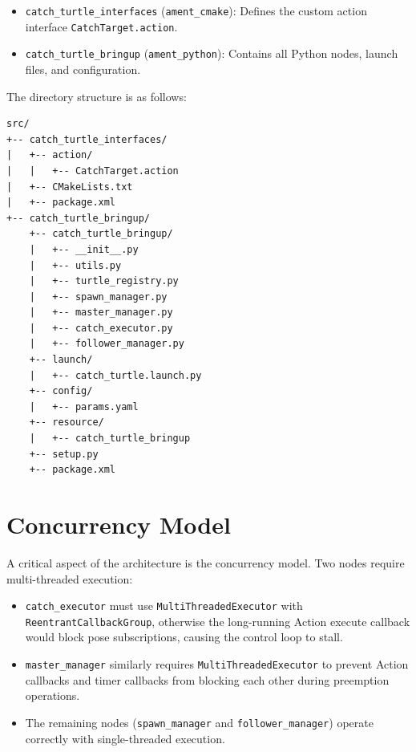 \begin{itemize}
  \item \texttt{catch\_turtle\_interfaces} (\texttt{ament\_cmake}): Defines the custom action interface \texttt{CatchTarget.action}.
  \item \texttt{catch\_turtle\_bringup} (\texttt{ament\_python}): Contains all Python nodes, launch files, and configuration.
\end{itemize}

The directory structure is as follows:

\begin{lstlisting}[language={},title={Project Directory Structure}]
src/
+-- catch_turtle_interfaces/
|   +-- action/
|   |   +-- CatchTarget.action
|   +-- CMakeLists.txt
|   +-- package.xml
+-- catch_turtle_bringup/
    +-- catch_turtle_bringup/
    |   +-- __init__.py
    |   +-- utils.py
    |   +-- turtle_registry.py
    |   +-- spawn_manager.py
    |   +-- master_manager.py
    |   +-- catch_executor.py
    |   +-- follower_manager.py
    +-- launch/
    |   +-- catch_turtle.launch.py
    +-- config/
    |   +-- params.yaml
    +-- resource/
    |   +-- catch_turtle_bringup
    +-- setup.py
    +-- package.xml
\end{lstlisting}

\section{Concurrency Model}

A critical aspect of the architecture is the concurrency model. Two nodes require multi-threaded execution:

\begin{itemize}
  \item \texttt{catch\_executor} must use \texttt{MultiThreadedExecutor} with \texttt{ReentrantCallbackGroup}, otherwise the long-running Action execute callback would block pose subscriptions, causing the control loop to stall.
  \item \texttt{master\_manager} similarly requires \texttt{MultiThreadedExecutor} to prevent Action callbacks and timer callbacks from blocking each other during preemption operations.
  \item The remaining nodes (\texttt{spawn\_manager} and \texttt{follower\_manager}) operate correctly with single-threaded execution.
\end{itemize}
